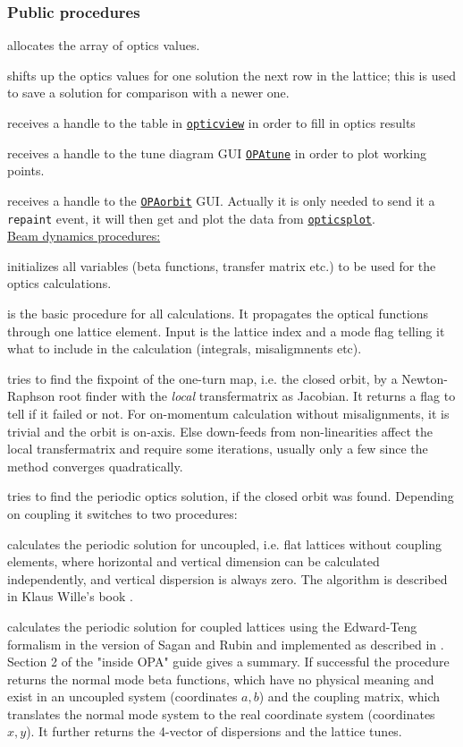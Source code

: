 \documentclass[12pt]{article}
\newcommand\code[1]{{\tt #1}}
\newcommand{\unico}[1]{{\color{burntorange}\code{#1}}}
\newcommand{\opagui}[1]{\colorbox{blue!20}{\code{#1}}}
\newcommand{\ogui}[1]{\hyperref[#1]{\opagui{#1}}}
\newcommand{\opauni}[1]{\colorbox{orange!30}{\code{#1}}}
\newcommand{\ouni}[1]{\hyperref[#1]{\opauni{#1}}}
\newcommand{\ppro}[1]{\subsubsection*{Public procedures} #1}
\begin{document}
\ppro{
\unico{allocOpval} allocates the array of optics values.

\unico{shiftOpval} shifts up the optics values for one solution the next row in the lattice; this is used to save a solution for comparison with a newer one.

\unico{setTabHandle} receives a handle to the table in \ogui{opticview} in order to fill in optics results

\unico{setTunePlotHandle} receives a handle to the tune diagram GUI \ogui{OPAtune} in order to plot working points.

\unico{setOrbitHandle} receives a handle to the \ogui{OPAorbit} GUI. Actually it is only needed to send it a \code{repaint} event, it will then get and plot the data from \ouni{opticsplot}.\\

\underline{Beam dynamics procedures:}

\unico{OptInit} initializes all variables (beta functions, transfer matrix etc.) to be used for the optics calculations.

\unico{Lattel} is the basic procedure for all calculations. It propagates the optical functions through one lattice element. Input is the lattice index and a mode flag telling it what to include in the calculation (integrals, misaligmnents etc). 

\unico{ClosedOrbit} tries to find the fixpoint of the one-turn map, i.e. the closed orbit, by a Newton-Raphson root finder with the {\em local} transfermatrix as Jacobian. It returns a flag to tell if it failed or not. For on-momentum calculation without misalignments, it is trivial and the orbit is on-axis. Else down-feeds from non-linearities affect the local transfermatrix and require some iterations, usually only a few since the method converges quadratically.

\unico{Periodic} tries to find the periodic optics solution, if the closed orbit was found. Depending on coupling it switches to two procedures:

\unico{Flatperiodic} calculates the periodic solution for uncoupled, i.e. flat lattices without coupling elements, where horizontal and vertical dimension can be calculated independently, and vertical dispersion is always zero. The algorithm is described in Klaus Wille's book \cite{kwille}.

\unico{NormalMode} calculates the periodic solution for coupled lattices using the Edward-Teng formalism in the version of Sagan and Rubin and implemented as described in \cite{VZAS}. Section 2 of the "inside OPA" guide \cite{inside} gives a summary. If successful the procedure returns the normal mode beta functions, which have no physical meaning and exist in an uncoupled system (coordinates $a,b$) and the coupling matrix, which translates the normal mode system to the real coordinate system (coordinates $x,y$). It further returns the 4-vector of dispersions and the lattice tunes.

}
\end{document}
